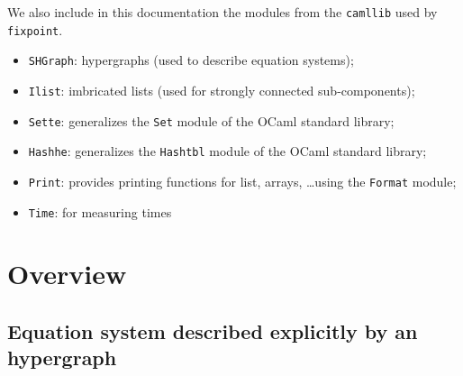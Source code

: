 \documentclass[twoside,10pt,a4paper]{report}
\begin{document}
We also include in this documentation the modules from the
\texttt{camllib} used by \texttt{fixpoint}.
\begin{itemize}\setlength{\itemsep}{0pt}
\item \texttt{SHGraph}: hypergraphs (used to describe equation systems);
\item \texttt{Ilist}: imbricated lists (used for strongly connected sub-components);
\item \texttt{Sette}: generalizes the \texttt{Set} module of the
  OCaml standard library;
\item \texttt{Hashhe}: generalizes the \texttt{Hashtbl} module of the
  OCaml standard library;
\item \texttt{Print}: provides printing functions for list,
  arrays, \ldots using the \texttt{Format} module;
\item \texttt{Time}: for measuring times
\end{itemize}

\section{Overview}

\subsection{Equation system described explicitly by an hypergraph}

\newcommand{\vtx}[1]{\pscirclebox[linecolor=green,fillstyle=solid,fillcolor=lightgreen]{#1}}
\newcommand{\edg}[1]{\psframebox[linecolor=blue,fillstyle=solid,fillcolor=lightblue]{#1}}
\end{document}
